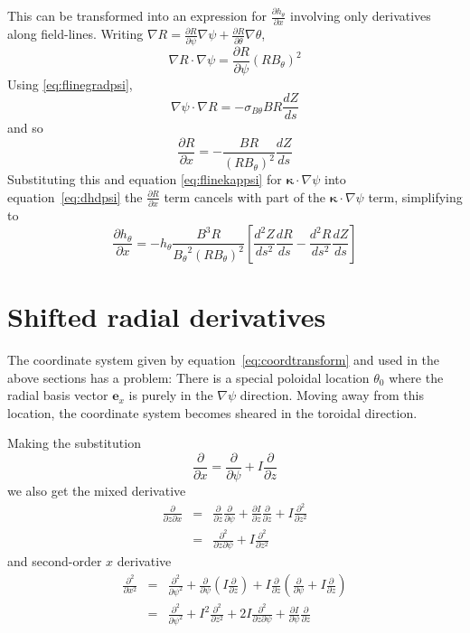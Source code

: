 \documentclass[12pt]{article}
\newcommand{\sbt}{\ensuremath{\sigma_{B\theta}}}
\newcommand{\deriv}[2]{\ensuremath{\frac{\partial #1}{\partial #2}}}
\newcommand{\hthe}{\ensuremath{h_\theta}}
\newcommand{\Bp}{\ensuremath{B_\theta}}
\newcommand{\Vec}[1]{\ensuremath{\mathbf{#1}}}
\newcommand{\kvec}{\Vec{\kappa}}
\newcommand{\rbp}{\ensuremath{R\Bp}}
\newcommand{\rbpsq}{\ensuremath{\left(\rbp\right)^2}}
\begin{document}
This can be transformed into an expression for $\deriv{\hthe}{x}$ involving only derivatives along
field-lines. 
Writing $\nabla R = \deriv{R}{\psi}\nabla\psi + \deriv{R}{\theta}\nabla\theta$, 
\[
\nabla R \cdot \nabla\psi = \deriv{R}{\psi}\rbpsq
\]
Using \ref{eq:flinegradpsi}, 
\[
\nabla\psi \cdot \nabla R = -\sbt B R\frac{dZ}{ds}
\]
and so
\[
\deriv{R}{x} = -\frac{BR}{\rbpsq}\frac{dZ}{ds}
\]
Substituting this and equation \ref{eq:flinekappsi} for $\kvec\cdot\nabla\psi$ into equation~\ref{eq:dhdpsi}
the $\deriv{R}{x}$ term cancels with part of the $\kvec\cdot\nabla\psi$ term, simplifying to
\begin{equation}
\deriv{\hthe}{x} = -\hthe\frac{B^3R}{\Bp^2\rbpsq}\left[\frac{d^2Z}{ds^2}\frac{dR}{ds} - \frac{d^2R}{ds^2}\frac{dZ}{ds}\right]
\end{equation}

\section{Shifted radial derivatives}
\label{sec:shiftcoords}

The coordinate system given by equation~\ref{eq:coordtransform} and used in the
above sections has a problem: There is a special poloidal location $\theta_0$
where the radial basis vector $\Vec{e}_x$ is purely in the $\nabla\psi$ direction.
Moving away from this location, the coordinate system becomes sheared in the toroidal
direction. 

Making the substitution
\begin{equation}
\deriv{}{x} = \deriv{}{\psi} + I\deriv{}{z}
\label{eq:ddx_identity}
\end{equation}
we also get the mixed derivative
\begin{eqnarray}
\frac{\partial}{\partial z\partial x} &=& \deriv{}{z}\deriv{}{\psi} + \deriv{I}{z}\deriv{}{z} + I\frac{\partial^2}{\partial z^2} \nonumber \\
&=& \frac{\partial^2}{\partial z\partial \psi} + I\frac{\partial^2}{\partial z^2}
\end{eqnarray}
and second-order $x$ derivative
\begin{eqnarray}
\frac{\partial^2}{\partial x^2} &=& \frac{\partial^2}{\partial \psi^2} + \deriv{}{\psi}\left(I\deriv{}{z}\right) + I\deriv{}{z}\left(\deriv{}{\psi} + I\deriv{}{z}\right) \nonumber \\
&=& \frac{\partial^2}{\partial \psi^2} + I^2\frac{\partial^2}{\partial z^2} + 2I\frac{\partial^2}{\partial z\partial \psi} + \deriv{I}{\psi}\deriv{}{z}
\end{eqnarray}
\end{document}

